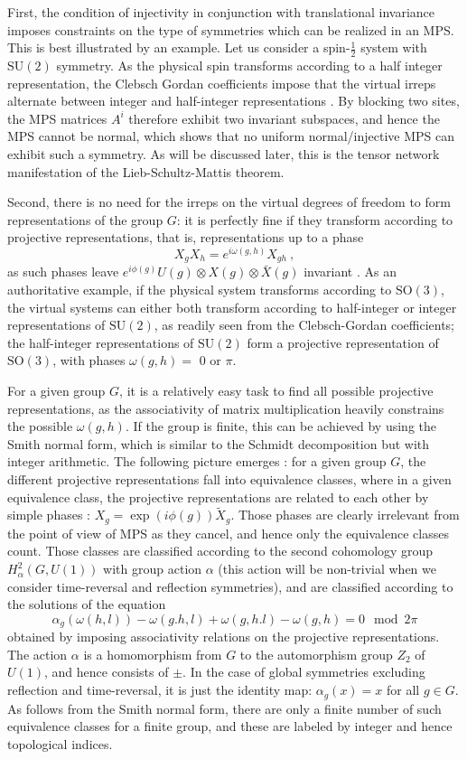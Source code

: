 \documentclass[rmp,aps,reprint,superscriptaddress,nobalancelastpage]{revtex4-1}
\newcommand{\be}{\begin{equation}}
\newcommand{\ee}{\end{equation}}
\newcommand{\SO}{\mathrm{SO}}
\newcommand{\SU}{\mathrm{SU}}
\begin{document}
First, the condition of injectivity in conjunction with translational invariance imposes constraints on the type of symmetries which can be realized in an MPS. This is best illustrated by an example. Let us consider a spin-$\tfrac12$ system with $\SU(2)$ symmetry. As the physical spin transforms according to a half integer representation, the Clebsch Gordan coefficients impose that the virtual irreps alternate between integer and half-integer representations \cite{sanz:mps-syms}. By blocking two sites, the MPS matrices $A^i$ therefore  exhibit two invariant subspaces, and hence the MPS cannot be normal, which shows that no uniform normal/injective  MPS can exhibit such a symmetry. As will be discussed later, this is the tensor network manifestation of the Lieb-Schultz-Mattis theorem.


Second, there is no need for the irreps on the virtual degrees of freedom to form representations of the group $G$: it is perfectly fine if they transform according to projective representations, that is, representations up to a phase
\be X_gX_h=e^{i\omega(g,h)}X_{gh}\ , \ee
as such phases leave $e^{i\phi(g)}U(g)\otimes X(g)\otimes \bar{X}(g)$ invariant \cite{pollmann:1d-sym-protection-prb,chen:1d-phases-rg,schuch:mps-phases}. As an authoritative example, if the physical system transforms according to $\SO(3)$, the virtual systems can either both transform according to half-integer or integer representations of $\SU(2)$, as readily seen from the Clebsch-Gordan coefficients; the half-integer representations of $\SU(2)$ form a projective representation of $\SO(3)$, with phases $\omega(g,h)=$ $0$ or $\pi$.

For a given group $G$, it is a relatively easy task to find all possible projective representations, as the associativity of matrix multiplication heavily constrains the possible $\omega(g,h)$.  If the group is finite, this can be achieved by using the Smith normal form, which is similar to the Schmidt decomposition but with integer arithmetic. The following picture emerges \cite{chen:spt-order-and-cohomology}: for a given group $G$, the different projective representations fall into equivalence classes, where in a given equivalence class, the projective representations are related to each other by simple phases : $X_g=\exp(i\phi(g))\tilde{X}_g$. Those phases are clearly irrelevant from the point of view of MPS as they cancel, and hence only the equivalence classes count. Those classes are classified according to the second cohomology group $H^2_\alpha(G,U(1))$ with group action $\alpha$ (this action will be non-trivial when we  consider time-reversal and reflection symmetries), and are classified according to the solutions of the equation
\be \alpha_g(\omega(h,l))- \omega(g.h,l)+\omega(g,h.l)-\omega(g,h)=0 \mod 2\pi\ee
obtained by imposing associativity relations on the projective representations. The action $\alpha$ is a homomorphism from $G$ to the automorphism group $Z_2$ of $U(1)$, and hence consists of $\pm$. In the case of global symmetries excluding reflection and time-reversal, it is just the identity map: $\alpha_g(x)=x$ for all $g\in G$. As follows from the Smith normal form, there are only a finite number of such equivalence classes for a finite group, and these are labeled by integer and hence topological indices.
\end{document}
